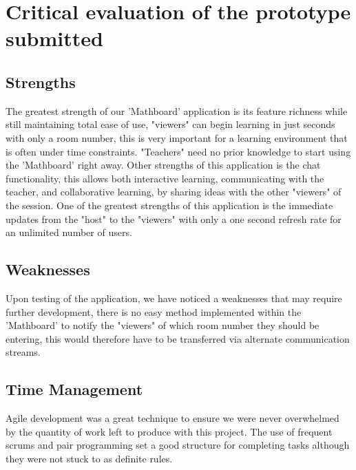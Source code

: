 \chapter{Critical evaluation of the prototype submitted}\label{ch:eval}\vspace{-10mm}

\section{Strengths}
The greatest strength of our 'Mathboard' application is its feature richness while still maintaining total ease of use, "viewers" can begin learning in just seconds with only a room number, this is very important for a learning environment that is often under time constraints. "Teachers" need no prior knowledge to start using the 'Mathboard' right away. Other strengths of this application is the chat functionality, this allows both interactive learning, communicating with the teacher, and collaborative learning, by sharing ideas with the other "viewers" of the session. One of the greatest strengths of this application is the immediate updates from the "host" to the "viewers" with only a one second refresh rate for an unlimited number of users.

\section{Weaknesses}
Upon testing of the application, we have noticed a weaknesses that may require further development, there is no easy method implemented within the 'Mathboard' to notify the "viewers" of which room number they should be entering, this would therefore have to be transferred via alternate communication streams.

\section{Time Management}
Agile development was a great technique to ensure we were never overwhelmed by the quantity of work left to produce with this project. The use of frequent scrums and pair programming set a good structure for completing tasks although they were not stuck to as definite rules.

